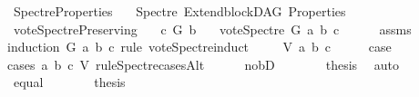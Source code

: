 %
\begin{isabellebody}%
%
%
\isadelimtheory
%
\endisadelimtheory
%
\isatagtheory
{}\isamarkupfalse%
\ Spectre{\isacharunderscore}{\kern0pt}Properties\isanewline
\ \ \ Spectre\ ExtendblockDAG\ Properties\isanewline
{}%
\endisatagtheory
{\isafoldtheory}%
%
\isadelimtheory
%
\endisadelimtheory
%
\isadelimdocument
%
\endisadelimdocument
%
\isatagdocument
%
\isamarkuptrue%
%
\isamarkuptrue%
%
\endisatagdocument
{\isafolddocument}%
%
\isadelimdocument
%
\endisadelimdocument
{}\isamarkupfalse%
\ vote{\isacharunderscore}{\kern0pt}Spectre{\isacharunderscore}{\kern0pt}Preserving{\isacharcolon}{\kern0pt}\isanewline
\ \ \ {\isachardoublequoteopen}c\ {\isasymrightarrow}\isactrlsup {\isacharplus}{\kern0pt}\isactrlbsub G\isactrlesub \ b{\isachardoublequoteclose}\isanewline
\ \ \ {\isachardoublequoteopen}vote{\isacharunderscore}{\kern0pt}Spectre\ G\ a\ b\ c\ {\isasymin}\ {\isacharbraceleft}{\kern0pt}{}{\isacharcomma}{\kern0pt}{}{\isacharbraceright}{\kern0pt}{\isachardoublequoteclose}\isanewline
%
\isadelimproof
\ \ %
\endisadelimproof
%
\isatagproof
{}\isamarkupfalse%
\ assms\isanewline
{}\isamarkupfalse%
{\isacharparenleft}{\kern0pt}induction\ G\ a\ b\ c\ rule{\isacharcolon}{\kern0pt}\ vote{\isacharunderscore}{\kern0pt}Spectre{\isachardot}{\kern0pt}induct{\isacharparenright}{\kern0pt}\isanewline
\ \ \isamarkupfalse%
\ {\isacharparenleft}{\kern0pt}{}\ V\ a\ b\ c{\isacharparenright}{\kern0pt}\isanewline
\ \ \isamarkupfalse%
\ \isamarkupfalse%
\ {\isacharquery}{\kern0pt}case\ \isanewline
\ \ \isamarkupfalse%
{\isacharparenleft}{\kern0pt}cases\ a\ b\ c\ V\ rule{\isacharcolon}{\kern0pt}Spectre{\isacharunderscore}{\kern0pt}casesAlt{\isacharparenright}{\kern0pt}\isanewline
\ \ \ \ \isamarkupfalse%
\ no{\isacharunderscore}{\kern0pt}bD\isanewline
\ \ \ \ \isamarkupfalse%
\ \isamarkupfalse%
\ {\isacharquery}{\kern0pt}thesis\ \isamarkupfalse%
\ auto\isanewline
\ \ \isamarkupfalse%
\isanewline
\ \ \ \ \isamarkupfalse%
\ equal\isanewline
\ \ \ \ \isamarkupfalse%
\ \isamarkupfalse%
\ {\isacharquery}{\kern0pt}thesis\ \ \isamarkupfalse%

\end{isabellebody}
